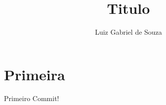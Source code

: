 \documentclass{article}
\title{Titulo}
\author{Luiz Gabriel de Souza}
\begin{document}
\maketitle

\section{Primeira}
Primeiro Commit!
\end{document}

